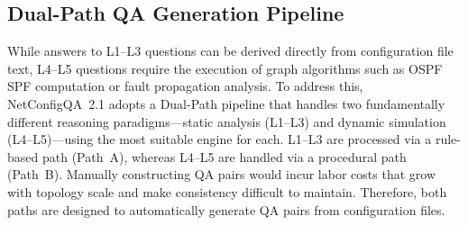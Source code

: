 

\subsection{Dual-Path QA Generation Pipeline}

While answers to L1--L3 questions can be derived directly from configuration file text, L4--L5 questions require the execution of graph algorithms such as OSPF SPF computation or fault propagation analysis.
To address this, NetConfigQA~2.1 adopts a Dual-Path pipeline that handles two fundamentally different reasoning paradigms—static analysis (L1--L3) and dynamic simulation (L4--L5)—using the most suitable engine for each.
L1--L3 are processed via a rule-based path (Path~A), whereas L4--L5 are handled via a procedural path (Path~B).
Manually constructing QA pairs would incur labor costs that grow with topology scale and make consistency difficult to maintain. Therefore, both paths are designed to automatically generate QA pairs from configuration files.



